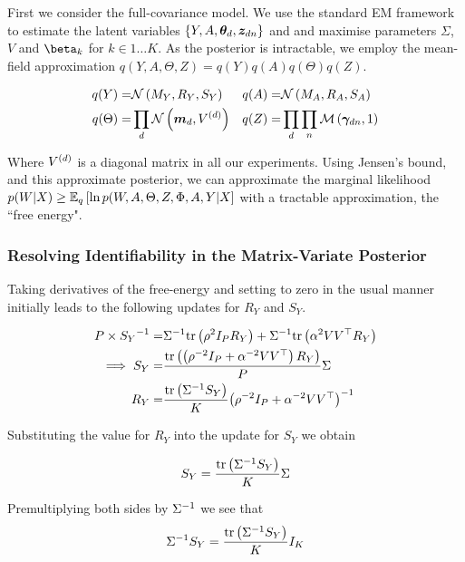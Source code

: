 \newcommand \sigmoid[1] { {  \vv{\sigma}\left( #1 \right)  } }
\newcommand \sigmoidk[1] { {  \sigmoidat{#1}{k}  } }
\newcommand \sigmoidat[2] { {  \sigma_{#2}\left( #1 \right)  } }
\newcommand \ged { { \nabla_{\Ed} } }
\newcommand \gesig { { \ged \left[ \sigmoid{\Ed} \right] } }

First we consider the full-covariance model. We use the standard EM framework to estimate the latent variables $\{Y, A, \thd, \zdn\}$ and and maximise parameters $\Sigma$, $V$ and $\vv{\beta}_k$ for $k \in 1\ldots K$. As the posterior is intractable, we employ the mean-field approximation $q(Y, A, \Theta, Z) = q(Y)q(A)q(\Theta)q(Z)$. 

\begin{align}
q(Y) = & \mnor{M_Y}{R_Y}{S_Y} & q(A) = & \mnor{M_A}{R_A}{S_A} \\ 
q(\Theta) = & \prod_d \nor{\md}{\Vd} & q(Z) = & \prod_d \prod_n \muln{\vv{\gamma}_{dn}}{1} 
\end{align}


Where $\Vd$ is a diagonal matrix in all our experiments. Using Jensen's bound, and this approximate posterior, we can approximate the marginal likelihood $p(W | X) \geq \ex{\ln p(W,A,\Theta,Z,\Phi,A,Y| X}{q}$ with a tractable approximation, the ``free energy".

\subsubsection{Resolving Identifiability in the Matrix-Variate Posterior}
Taking derivatives of the free-energy and setting to zero in the usual manner initially leads to the following updates for $R_Y$ and $S_Y$.

\begin{align}
P \times \inv{S_Y} = & \inv{\Sigma}\Tr{\rho^2 I_P R_Y} + \inv{\Sigma}\Tr{\alpha^2 V V\T R_Y} \\
\implies S_Y = & \frac{\Tr{\left(\rho^{-2} I_P + \alpha^{-2} V V\T\right) R_Y}}{P} \Sigma \\ 
R_Y = & \frac{\Tr{\inv{\Sigma}S_Y}}{K} \invb{\rho^{-2} I_P + \alpha^{-2} V V\T}\end{align}

Substituting the value for $R_Y$ into the update for $S_Y$ we obtain

\begin{align}
S_Y = \frac{\Tr{\inv{\Sigma}S_Y}}{K} \Sigma
\end{align}

Premultiplying both sides by $\inv{\Sigma}$ we see that
\begin{align}
\inv{\Sigma} S_Y = \frac{\Tr{\inv{\Sigma}S_Y}}{K} I_K
\end{align}

